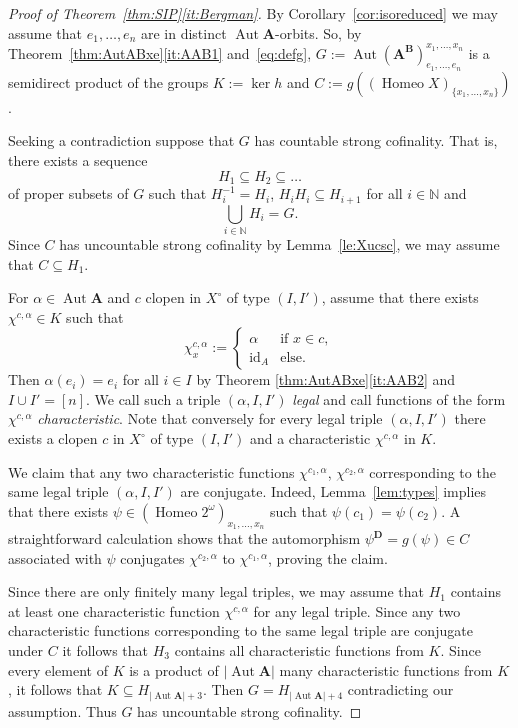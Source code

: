 \documentclass[12pt,a4paper,reqno]{amsart}
\numberwithin{equation}{section}
\theoremstyle{plain}
\theoremstyle{definition}
\newcommand{\A}{\mathbf{A}}
\newcommand{\ABxe}{(\mathbf{A^B})^{x_1,\dots,x_n}_{e_1,\dots,e_n}}
\newcommand{\D}{\mathbf{D}}
\newcommand{\id}{\mathrm{id}}
\newcommand{\N}{\mathbb{N}}
\DeclareMathOperator{\Aut}{Aut}
\DeclareMathOperator{\Homeo}{Homeo}
\begin{document}
\begin{proof}[Proof of Theorem~\ref{thm:SIP}\eqref{it:Bergman}]
 By Corollary~\ref{cor:isoreduced} we may assume that $e_1,\dots,e_n$ are in distinct $\Aut\A$-orbits. 
 So, by Theorem~\ref{thm:AutABxe}\eqref{it:AAB1} and~\eqref{eq:defg},
 $G := \Aut\ABxe$ is a semidirect product of the groups $K := \ker h$ and
 $C := g((\Homeo X)_{\{x_1,\dots,x_n\}})$.
   
 Seeking a contradiction suppose that $G$ has countable strong cofinality.
 That is, there exists a sequence
\[ H_1 \subseteq H_2 \subseteq \dots \]
 of proper subsets of $G$ such that $H_i^{-1} = H_i$, $H_iH_i \subseteq H_{i+1}$ for all $i\in\N$ and
\[ \bigcup_{i\in\N} H_i = G. \]
 Since $C$ has uncountable strong cofinality by Lemma~\ref{le:Xucsc}, we may assume that $C \subseteq H_1$.

 For $\alpha\in\Aut\A$ and $c$ clopen in $X^\circ$ of type $(I,I')$, assume that there exists $\chi^{c,\alpha}\in K$
 such that 
\[ \chi^{c,\alpha}_x := \begin{cases} \alpha & \text{if } x\in c, \\ \id_A & \text{else.} \end{cases} \]
 Then $\alpha(e_i) = e_i$ for all $i\in I$ by Theorem \ref{thm:AutABxe}\eqref{it:AAB2} and $I\cup I' = [n]$.
 We call such a triple $(\alpha,I, I')$ \emph{legal} and call functions of the form $\chi^{c,\alpha}$ \emph{characteristic}.
 Note that conversely for every legal triple $(\alpha,I, I')$ there exists a clopen $c$ in $X^\circ$ of type $(I,I')$
 and a characteristic $\chi^{c,\alpha}$ in $K$. 
 
 
 We claim that  any two characteristic functions $\chi^{c_1,\alpha}$, $\chi^{c_2,\alpha}$
 corresponding to the same legal triple $(\alpha,I, I')$ are conjugate.
 Indeed, Lemma~\ref{lem:types} implies that there exists
$\psi\in(\Homeo 2^\omega)_{x_1,\dots,x_n}$ such that $\psi(c_1)=\psi(c_2)$.
A straightforward calculation shows that the automorphism $\psi^\D=g(\psi)\in  C$ associated with $\psi$ conjugates $\chi^{c_2,\alpha}$ to $\chi^{c_1,\alpha}$, proving the claim.
 
 Since there are only finitely many legal triples, 
 we may assume that $H_1$ contains at least one characteristic function $\chi^{c,\alpha}$ for any legal triple.
 Since any two characteristic functions corresponding to the same legal triple are conjugate under $C$ it follows that
  $H_3$ contains all characteristic functions from $K$.
 Since every element of $K$ is a product of $|\Aut\A|$ many characteristic functions from $K$,
 it follows that $K \subseteq H_{|\Aut\A|+3}$.
 Then $G = H_{|\Aut\A|+4}$ contradicting our assumption. Thus $G$ has uncountable strong cofinality.
\end{proof}
\end{document}
